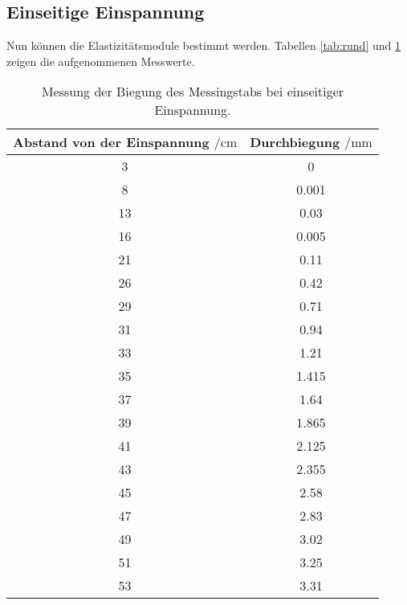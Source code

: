\subsection{Einseitige Einspannung}
  Nun können die Elastizitätsmodule bestimmt werden. Tabellen \ref{tab:rund} und \ref{tab:eck} 
  zeigen die aufgenommenen Messwerte.\\

  \begin{table}
    \centering
    \caption{Messung der Biegung des Messingstabs bei einseitiger Einspannung.}
    \label{tab:eck}
    \begin{tabular}{c c}
      \toprule
      Abstand von der Einspannung $\mathbin{/} \si{\centi\m}$ & Durchbiegung $\mathbin{/} \si{\milli\m}$\\
      \midrule
      3  & 0\\
      8  & 0.001\\
      13 & 0.03\\
      16 & 0.005\\
      21 & 0.11\\
      26 & 0.42\\
      29 & 0.71\\
      31 & 0.94\\
      33 & 1.21\\
      35 & 1.415\\
      37 & 1.64\\
      39 & 1.865\\
      41 & 2.125\\
      43 & 2.355\\
      45 & 2.58\\
      47 & 2.83\\
      49 & 3.02\\
      51 & 3.25\\
      53 & 3.31\\
      \bottomrule
    \end{tabular}
  \end{table}

